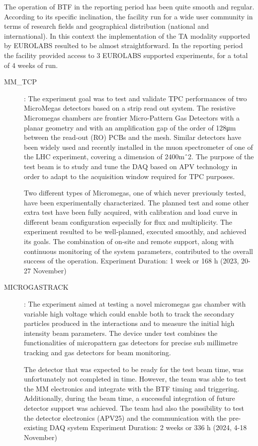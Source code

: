 The operation of BTF in the reporting period has been quite smooth and regular. According to its specific inclination, the facility run for a wide user community in terms of research fields and geographical distribution (national and international). In this context the implementation of the TA modality supported by EUROLABS resulted to be almost straightforward. In the reporting period the facility provided access to 3 EUROLABS supported experiments, for a total of 4 weeks of run.
\begin{description}
\item[MM_TCP]:
The experiment goal was to test and validate TPC performances of two MicroMegas detectors based on a strip read out system. The resistive Micromegas chambers are frontier Micro-Pattern Gas Detectors with a planar geometry and with an amplification gap of the order of 128μm between the read-out (RO) PCBs and the mesh. Similar detectors have been widely used and recently installed in the muon spectrometer of one of the LHC experiment, covering a dimension of 2400mˆ2.
The purpose of the test beam is to study and tune the DAQ based on APV technology in order to adapt to the acquisition window required for TPC purposes.

Two different types of Micromegas, one of which never previously tested, have been experimentally characterized. The planned test and some other extra test have been fully acquired, with calibration and load curve in different beam configuration especially for flux and multiplicity.
The experiment resulted to be well-planned, executed smoothly, and achieved its goals. The combination of on-site and remote support, along with continuous monitoring of the system parameters, contributed to the overall success of the operation.
Experiment Duration: 1 week or 168 h (2023, 20-27 November)

\item[MICROGASTRACK]:
The experiment aimed at testing a novel micromegas gas chamber with variable high voltage which could enable both to track the secondary particles produced in the interactions and to measure the initial high intensity beam parameters. The device under test combines the functionalities of micropattern gas detectors for precise sub millimetre tracking and gas detectors for beam monitoring.

The detector that was expected to be ready for the test beam time, was unfortunately not completed in time. However, the team was able to test the MM electronics and integrate with the BTF timing and triggering. Additionally, during the beam time, a successful integration of future detector support was achieved. The team had also the possibility to test the detector electronics (APV25) and the communication with the pre-existing DAQ system
Experiment Duration: 2 weeks or 336 h (2024, 4-18 November)


\end{description}
